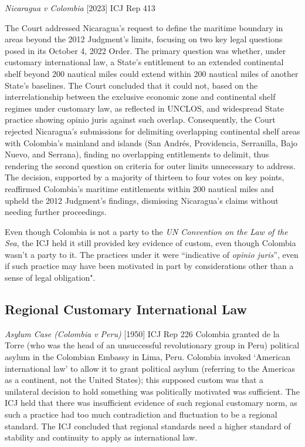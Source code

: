 \begin{casedetails}{\textit{Nicaragua v Colombia} [2023] ICJ Rep 413}
    \flushleft

    The Court addressed Nicaragua's request to define the maritime boundary in areas beyond the 2012 Judgment's limits, focusing on two key legal questions posed in its October 4, 2022 Order. The primary question was whether, under customary international law, a State's entitlement to an extended continental shelf beyond 200 nautical miles could extend within 200 nautical miles of another State's baselines. The Court concluded that it could not, based on the interrelationship between the exclusive economic zone and continental shelf regimes under customary law, as reflected in UNCLOS, and widespread State practice showing opinio juris against such overlap. Consequently, the Court rejected Nicaragua's submissions for delimiting overlapping continental shelf areas with Colombia's mainland and islands (San Andrés, Providencia, Serranilla, Bajo Nuevo, and Serrana), finding no overlapping entitlements to delimit, thus rendering the second question on criteria for outer limits unnecessary to address. The decision, supported by a majority of thirteen to four votes on key points, reaffirmed Colombia's maritime entitlements within 200 nautical miles and upheld the 2012 Judgment's findings, dismissing Nicaragua's claims without needing further proceedings.

    \tcblower
    \flushleft

    Even though Colombia is not a party to the \textit{UN Convention on the Law of the Sea}, the ICJ held it still provided key evidence of custom, even though Colombia wasn't a party to it. The practices under it were ``indicative of \textit{opinio juris}'', even if such practice may have been motivated in part by considerations other than a sense of legal obligation".
\end{casedetails}

\subsection{Regional Customary International Law}
\begin{casedetails}{\textit{Asylum Case (Colombia v Peru)} [1950] ICJ Rep 226}
    \flushleft
    Colombia granted de la Torre (who was the head of an unsuccessful revolutionary group in Peru) political asylum in the Colombian Embassy in Lima, Peru. Colombia invoked `American international law' to allow it to grant political asylum (referring to the Americas as a continent, not the United States); this supposed custom was that a unilateral decision to hold something was politically motivated was sufficient. The ICJ held that there was insufficient evidence of such regional customary norm, as such a practice had too much contradiction and fluctuation to be a regional standard. The ICJ concluded that regional standards need a higher standard of stability and continuity to apply as international law.
\end{casedetails}

